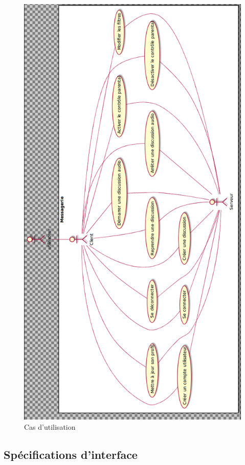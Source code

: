 	\begin{figure}[!h]
		\centering \includegraphics[scale=0.46]{img/usecase.png}
		\caption{Cas d'utilisation}
	\end{figure}
	
	
\subsection{Spécifications d’interface}

